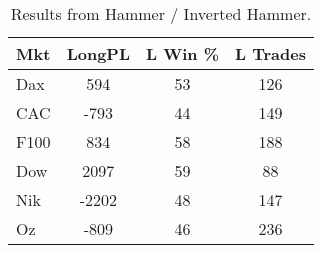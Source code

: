 \begin{table}[ht]
\centering
\caption[Hammer System]{Results from Hammer / Inverted Hammer.} 
\label{tab:hammer_results}
\begin{tabular}{lccc}
  \toprule Mkt & LongPL & L Win \% & L Trades \\ 
  \midrule Dax & 594 & 53 & 126 \\ 
  CAC & -793 & 44 & 149 \\ 
  F100 & 834 & 58 & 188 \\ 
  Dow & 2097 & 59 & 88 \\ 
  Nik & -2202 & 48 & 147 \\ 
  Oz & -809 & 46 & 236 \\ 
   \bottomrule \end{tabular}
\end{table}
